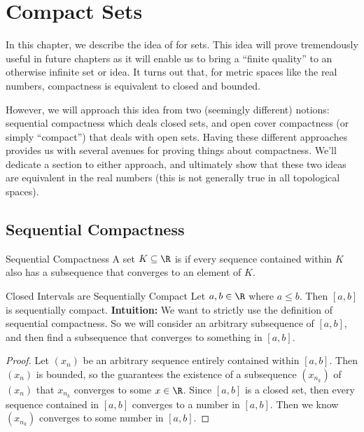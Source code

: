
\chapter{Compact Sets}

In this chapter, we describe the idea of  for sets. This idea will prove tremendously useful in future chapters as it will enable us to bring a ``finite quality'' to an otherwise infinite set or idea. It turns out that, for metric spaces like the real numbers, compactness is equivalent to closed and bounded.

However, we will approach this idea from two (seemingly different) notions: sequential compactness which deals closed sets, and open cover compactness (or simply ``compact'') that deals with open sets. Having these different approaches provides us with several avenues for proving things about compactness. We'll dedicate a section to either approach, and ultimately show that these two ideas are equivalent in the real numbers (this is not generally true in all topological spaces).

\section{Sequential Compactness}
\begin{dfnbox}{Sequential Compactness}{}
    A set $K \subseteq \R$ is  if every sequence contained within $K$ also has a subsequence that converges to an element of $K$.
\end{dfnbox}

\begin{exbox}{Closed Intervals are Sequentially Compact}{}
    Let $a,b \in \R$ where $a \leq b$. Then $[a,b]$ is sequentially compact.
    \tcblower
    \textbf{Intuition:} We want to strictly use the definition of sequential compactness. So we will consider an arbitrary subsequence of $[a,b]$, and then find a subsequence that converges to something in $[a,b]$.
    \begin{proof}
        Let $(x_n)$ be an arbitrary sequence entirely contained within $[a,b]$. Then $(x_n)$ is bounded, so the  guarantees the existence of a subsequence $(x_{n_k})$ of $(x_n)$ that $x_{n_k}$ converges to some $x \in \R$. Since $[a,b]$ is a closed set, then every sequence contained in $[a,b]$ converges to a number in $[a,b]$. Then we know $(x_{n_k})$ converges to some number in $[a,b]$.
    \end{proof}
\end{exbox}

